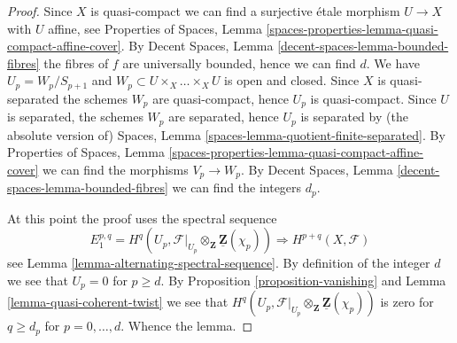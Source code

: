 \documentclass[10pt,a4paper]{amsart}
\theoremstyle{plain}
\theoremstyle{definition}
\theoremstyle{remark}
\numberwithin{equation}{subsection}
\begin{document}
\begin{proof}
Since $X$ is quasi-compact we can find a surjective \'etale morphism
$U \to X$ with $U$ affine, see
Properties of Spaces, Lemma
\ref{spaces-properties-lemma-quasi-compact-affine-cover}.
By
Decent Spaces, Lemma \ref{decent-spaces-lemma-bounded-fibres}
the fibres of $f$ are universally bounded, hence we can find $d$.
We have $U_p = W_p/S_{p + 1}$ and $W_p \subset U \times_X \ldots \times_X U$
is open and closed. Since $X$ is quasi-separated the schemes
$W_p$ are quasi-compact, hence $U_p$ is quasi-compact.
Since $U$ is separated, the schemes $W_p$ are separated, hence
$U_p$ is separated by (the absolute version of)
Spaces, Lemma \ref{spaces-lemma-quotient-finite-separated}.
By
Properties of Spaces, Lemma
\ref{spaces-properties-lemma-quasi-compact-affine-cover}
we can find the morphisms $V_p \to W_p$.
By
Decent Spaces, Lemma \ref{decent-spaces-lemma-bounded-fibres}
we can find the integers $d_p$.

\medskip\noindent
At this point the proof uses the spectral sequence
$$
E_1^{p, q} =
H^q(U_p, \mathcal{F}|_{U_p} \otimes_\mathbf{Z} \underline{\mathbf{Z}}(\chi_p))
\Rightarrow
H^{p + q}(X, \mathcal{F})
$$
see
Lemma \ref{lemma-alternating-spectral-sequence}.
By definition of the integer $d$ we see that $U_p = 0$ for $p \geq d$.
By Proposition \ref{proposition-vanishing}
and
Lemma \ref{lemma-quasi-coherent-twist}
we see that
$H^q(U_p,
\mathcal{F}|_{U_p} \otimes_\mathbf{Z} \underline{\mathbf{Z}}(\chi_p))$
is zero for $q \geq d_p$ for $p = 0, \ldots, d$.
Whence the lemma.
\end{proof}
\end{document}
